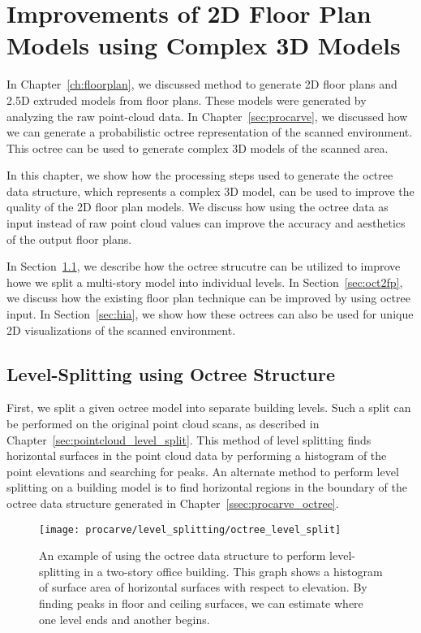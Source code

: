 \documentclass[12pt,onecolumn,oneside]{book}
\begin{document}
\chapter{Improvements of 2D Floor Plan Models using Complex 3D Models}
\label{ch:better_floorplans}

In Chapter~\ref{ch:floorplan}, we discussed method to generate 2D floor plans and 2.5D extruded models from floor plans.  These models were generated by analyzing the raw point-cloud data.  In Chapter~\ref{sec:procarve}, we discussed how we can generate a probabilistic octree representation of the scanned environment.  This octree can be used to generate complex 3D models of the scanned area.

In this chapter, we show how the processing steps used to generate the octree data structure, which represents a complex 3D model, can be used to improve the quality of the 2D floor plan models.  We discuss how using the octree data as input instead of raw point cloud values can improve the accuracy and aesthetics of the output floor plans.

In Section~\ref{sec:octree_level_split}, we describe how the octree strucutre can be utilized to improve howe we split a multi-story model into individual levels.  In Section~\ref{sec:oct2fp}, we discuss how the existing floor plan technique can be improved by using octree input.  In Section~\ref{sec:hia}, we show how these octrees can also be used for unique 2D visualizations of the scanned environment.

\section{Level-Splitting using Octree Structure}
\label{sec:octree_level_split}

First, we split a given octree model into separate building levels.  Such a split can be performed on the original point cloud scans, as described in Chapter~\ref{sec:pointcloud_level_split}.  This method of level splitting finds horizontal surfaces in the point cloud data by performing a histogram of the point elevations and searching for peaks.  An alternate method to perform level splitting on a building model is to find horizontal regions in the boundary of the octree data structure generated in Chapter~\ref{ssec:procarve_octree}.  

\begin{figure}
	\centerline{\texttt{[image: procarve/level\_splitting/octree\_level\_split]}}

	\caption[Using octree to find levels of two-story dataset.]{An example of using the octree data structure to perform level-splitting in a two-story office building.  This graph shows a histogram of surface area of horizontal surfaces with respect to elevation.  By finding peaks in floor and ceiling surfaces, we can estimate where one level ends and another begins.}
	\label{fig:octree_level_split}
\end{figure}
\end{document}
